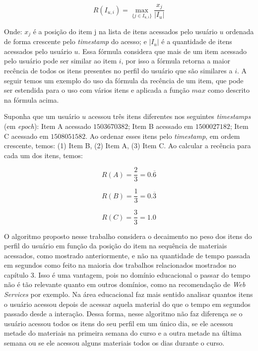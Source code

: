 \begin{equation}
  R(I_{u,i}) = \max_{\{j \in I_{u,i}\}}{\frac{x_j}{\left| I_u \right|}}
  \label{eq:recencia-proposta}
\end{equation}

Onde: $x_j$ é a posição do item j na lista de itens acessados pelo usuário $u$ ordenada de forma crescente pelo
\textit{timestamp} do acesso; e $\left| I_u \right|$ é a quantidade de itens acessados pelo usuário $u$. Essa fórmula considera
que mais de um item acessado pelo usuário pode ser similar ao item $i$, por isso a fórmula retorna a maior recência de
todos os itens presentes no perfil do usuário que são similares a $i$. A seguir temos um exemplo do uso da fórmula da
recência de um item, que pode ser estendida para o uso com vários itens e aplicada a função $max$ como descrito na
fórmula acima.

Suponha que um usuário $u$ acessou três itens diferentes nos seguintes \textit{timestamps} (em \textit{epoch}): Item A acessado $1503670382$;
Item B acessado em $1500027182$; Item C acessado em $1508051582$. Ao ordenar esses itens pelo \textit{timestamp}, em ordem
crescente, temos: (1) Item B, (2) Item A, (3) Item C. Ao calcular a recência para cada um dos itens, temos:

\begin{equation}
  R(A) = \frac{2}{3} = 0.\overline{6}
  \label{eq:recencia-item-a}
\end{equation}

\begin{equation}
  R(B) = \frac{1}{3} = 0.\overline{3}
  \label{eq:recencia-item-b}
\end{equation}

\begin{equation}
  R(C) = \frac{3}{3} = 1.0
  \label{eq:recencia-item-c}
\end{equation}

O algoritmo proposto nesse trabalho considera o decaimento no peso dos itens do perfil do usuário em função da posição
do item na sequência de materiais acessados, como mostrado anteriormente, e não na quantidade de tempo passada em
segundos como feito na maioria dos trabalhos relacionados mostrados no capítulo 3. Isso é uma vantagem, pois no domínio
educacional o passar do tempo não é tão relevante quanto em outros domínios, como na recomendação de \textit{Web Services} por
exemplo. Na área educacional faz mais sentido analisar quantos itens o usuário acessou depois de acessar aquela material
do que o tempo em segundos passado desde a interação. Dessa forma, nesse algoritmo não faz diferença se o usuário
acessou todos os itens do seu perfil em um único dia, se ele acessou metade do materiais na primeira semana do curso e
a outra metade na última semana ou se ele acessou alguns materiais todos os dias durante o curso.

